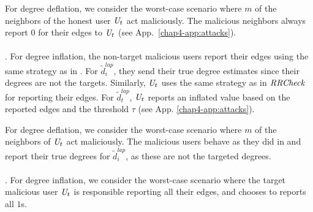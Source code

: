 For degree deflation, we consider the worst-case scenario where $m$ of the neighbors of the honest user $\textit{U}_t$ act maliciously. The malicious neighbors always report $0$ for their edges to $\textit{U}_t$ (see App.~\ref{chap4-app:attacks}).
\vspace{-0.2cm}\\\\
\noindent\DegHybrid. %
For degree inflation, the non-target malicious users report their edges using the same strategy as in \DegRRCheck{}. For $\tilde{d}_i^{lap}$, they send their true degree estimates since their degrees are not the targets. Similarly, $\textit{U}_t$ uses the same strategy as in $\textit{RRCheck}{}$ for reporting their edges. For $\tilde{d}_t^{lap}$, $\textit{U}_t$  reports an inflated value based on the reported edges and the threshold $\tau$ (see  App. \ref{chap4-app:attacks}).

For degree deflation, we consider the worst-case scenario where $m$ of the neighbors of $\textit{U}_t$ act maliciously. The malicious users behave as they did in \DegRRCheck{} and report their true degrees for $\tilde{d}_i^{lap}$, as these are not the targeted degrees.
\vspace{-0.2cm}\\\\
 \noindent\DegRRNaive. For degree inflation, we consider the worst-case scenario where the target malicious user $\textit{U}_t$ is responsible reporting all their edges, and chooses to reports all $1$s. %

